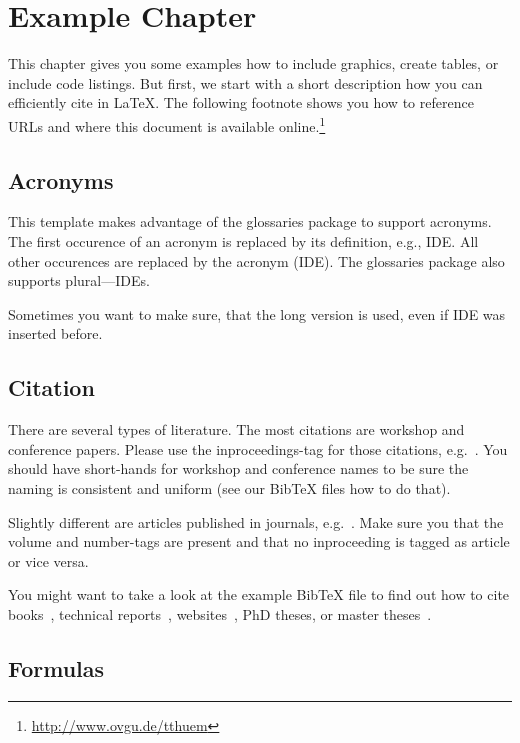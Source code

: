 \chapter{Example Chapter}
\label{example}

This chapter gives you some examples how to include graphics, create tables, or include code listings. But first, we start with a short description how you can efficiently cite in \LaTeX. The following footnote shows you how to reference URLs and where this document is available online.\footnote{\url{http://www.ovgu.de/tthuem}}

\section{Acronyms}

This template makes advantage of the glossaries package to support acronyms. The first occurence of an acronym is replaced by its definition, e.g., \gls{IDE}. All other occurences are replaced by the acronym (\gls{IDE}). The glossaries package also supports plural---\glspl{IDE}.

Sometimes you want to make sure, that the long version is used, even if \gls{IDE} was inserted before.

\section{Citation}

There are several types of literature. The most citations are workshop and conference papers. Please use the inproceedings-tag for those citations, e.g.~\cite{KAK:GPCE09}. You should have short-hands for workshop and conference names to be sure the naming is consistent and uniform (see our BibTeX files how to do that).

Slightly different are articles published in journals, e.g.~\cite{KG:SME06}. Make sure you that the volume and number-tags are present and that no inproceeding is tagged as article or vice versa.

You might want to take a look at the example BibTeX file to find out how to cite books~\cite{CE:BOOK00}, technical reports~\cite{KCHNP:TR90}, websites~\cite{Coq:website}, PhD theses, or master theses~\cite{B:PHD03,R:MT09}.

\section{Formulas}

